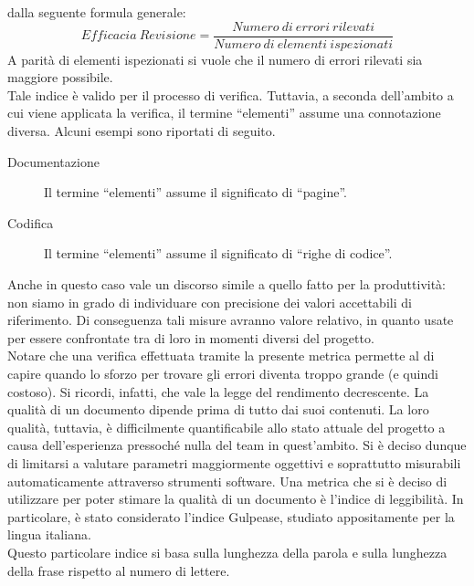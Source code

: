 					dalla seguente formula generale:
					\begin{equation} \label{eq:efficaciarevisione}
						Efficacia\ Revisione = \frac{Numero\ di\ errori\ rilevati}{Numero\ di\ elementi\ ispezionati}
					\end{equation}
					A parità di elementi ispezionati si vuole che il numero di errori rilevati sia maggiore possibile.\\
					Tale indice è valido per il processo di verifica. Tuttavia, a seconda dell'ambito a cui viene applicata la verifica, il termine 
					“elementi” assume una connotazione diversa. Alcuni esempi sono riportati di seguito.
					\begin{description}
						\item[Documentazione] Il termine “elementi” assume il significato di “pagine”.
						\item[Codifica] Il termine “elementi” assume il significato di “righe di codice”.
					\end{description}
					Anche in questo caso vale un discorso simile a quello fatto per la produttività: non siamo in grado di individuare con 
					precisione dei valori accettabili di riferimento. Di conseguenza tali misure avranno valore relativo, in quanto usate per essere 
					confrontate tra di loro in momenti diversi del progetto.\\
					Notare che una verifica effettuata tramite la presente metrica permette al  di capire quando lo sforzo per 
					trovare gli errori diventa troppo grande (e quindi costoso). Si ricordi, infatti, che vale la legge del rendimento decrescente.
				La qualità di un documento dipende prima di tutto dai suoi contenuti. La loro qualità, tuttavia, è difficilmente quantificabile allo 
				stato attuale del progetto a causa dell'esperienza pressoché nulla del team in quest'ambito. Si è deciso dunque di limitarsi a valutare 
				parametri maggiormente oggettivi e soprattutto misurabili automaticamente attraverso strumenti software.
					Una metrica che si è deciso di utilizzare per poter stimare la qualità di un documento è l'indice di leggibilità. In particolare, è 
					stato considerato l'indice Gulpease, studiato appositamente per la lingua italiana.\\
					Questo particolare indice si basa sulla lunghezza della parola e sulla lunghezza della frase rispetto al numero di lettere.\\
